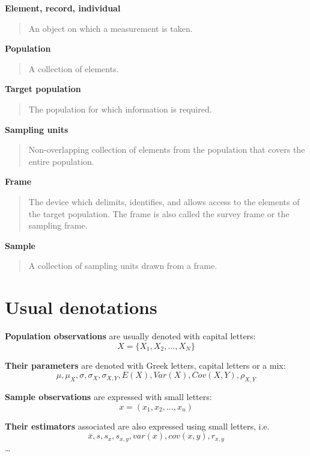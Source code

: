 \documentclass[
  letterpaper,
  DIV=11,
  numbers=noendperiod]{scrreprt}
\begin{document}
\textbf{Element, record, individual}

\begin{quote}
An object on which a measurement is taken.
\end{quote}

\textbf{Population}

\begin{quote}
A collection of elements.
\end{quote}

\textbf{Target population}

\begin{quote}
The population for which information is required.
\end{quote}

\textbf{Sampling units}

\begin{quote}
Non-overlapping collection of elements from the population that covers
the entire population.
\end{quote}

\textbf{Frame}

\begin{quote}
The device which delimits, identifies, and allows access to the elements
of the target population. The frame is also called the survey frame or
the sampling frame.
\end{quote}

\textbf{Sample}

\begin{quote}
A collection of sampling units drawn from a frame.
\end{quote}

\section{Usual denotations}\label{usual-denotations}

\textbf{Population observations} are usually denoted with capital
letters: \[X = \{X_1, X_2,..., X_N\}\]

\textbf{Their parameters} are denoted with Greek letters, capital
letters or a mix:
\[\mu, \mu_X, \sigma, \sigma_X, \sigma_{X,Y}, E(X), Var(X), Cov(X,Y), \rho_{X,Y}\]

\textbf{Sample observations} are expressed with small letters:
\[x = (x_1, x_2,..., x_n)\]

\textbf{Their estimators} associated are also expressed using small
letters, i.e.~\[\bar{x}, s, s_x, s_{x,y}, var(x), cov(x,y), r_{x,y}\]
\ldots{}
\end{document}

